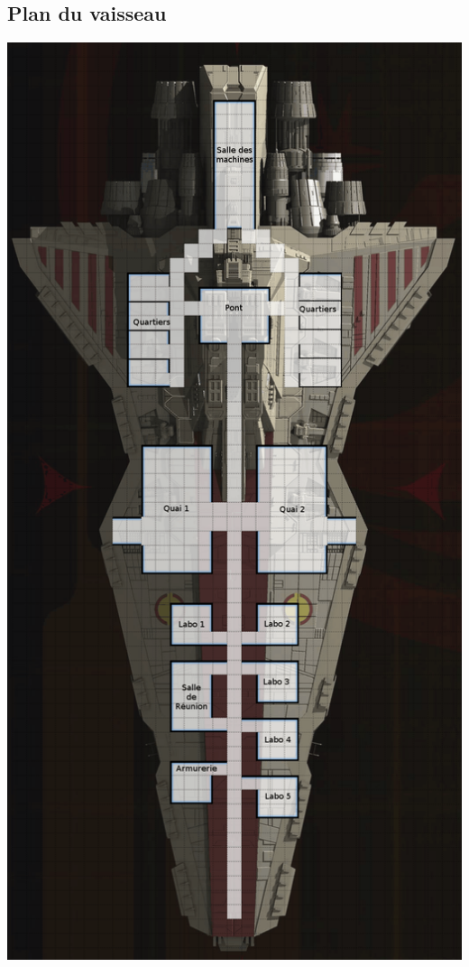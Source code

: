 \documentclass{jdrp}
\begin{document}
\subsection{Plan du vaisseau}
\noindent\includegraphics[width=\linewidth]{img/scenario/venator-plan.png}
\end{document}
